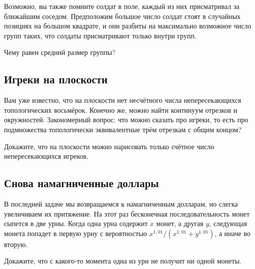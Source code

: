 Возможно, вы также помните солдат в поле, каждый из них присматривал за ближайшим соседом.
Предположим большое число солдат стоят в случайных позициях на большом квадрате, и они разбиты на максимально возможное число групп таких, что солдаты присматривают только внутри групп.

Чему равен средний размер группы?

\subsection*{Игреки на плоскости}

Вам уже известно, что на плоскости нет несчётного числа непересекающихся топологических восьмёрок.
Конечно же, можно найти континуум отрезков и окружностей.
Закономерный вопрос: что можно сказать про игреки, то есть про подмножества топологически эквивалентные трём отрезкам с общим концом?

Докажите, что на плоскости можно нарисовать только счётное число непересекающихся игреков.

\subsection*{Снова намагниченные доллары}

В последней задаче мы возвращаемся к намагниченным долларам, но слегка увеличиваем их притяжение.
На этот раз бесконечная последовательность монет сыпется в две урны.
Когда одна урна содержит $x$ монет, а другая $y$, следующая монета попадет в первую урну с вероятностью $x^{1{,}01}/(x^{1{,}01}+y^{1{,}01})$, а иначе во вторую.

Докажите, что с какого-то момента одна из урн не получит ни одной монеты.
